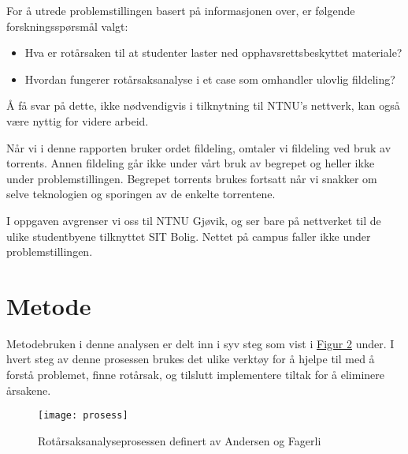 For å utrede problemstillingen basert på informasjonen over, er følgende forskningsspørsmål valgt: 
\begin{itemize}
    \item Hva er rotårsaken til at studenter laster ned opphavsrettsbeskyttet materiale?
    \item Hvordan fungerer rotårsaksanalyse i et case som omhandler ulovlig fildeling?
\end{itemize}

Å få svar på dette, ikke nødvendigvis i tilknytning til NTNU's nettverk, kan også være nyttig for videre arbeid.

Når vi i denne rapporten bruker ordet fildeling, omtaler vi fildeling ved bruk av torrents. Annen fildeling går ikke under vårt bruk av begrepet og heller ikke under problemstillingen. Begrepet torrents brukes fortsatt når vi snakker om selve teknologien og sporingen av de enkelte torrentene.

I oppgaven avgrenser vi oss til NTNU Gjøvik, og ser bare på nettverket til de ulike studentbyene tilknyttet SIT Bolig. Nettet på campus faller ikke under problemstillingen.

\section{Metode}
Metodebruken i denne analysen er delt inn i syv steg som vist i \hyperref[fig:prosess]{Figur 2} under. I hvert steg av denne prosessen brukes det ulike verktøy for å hjelpe til med å forstå problemet, finne rotårsak, og tilslutt implementere tiltak for å eliminere årsakene. 
\begin{figure}[H]
    \centering
    \texttt{[image: prosess]}
    \label{fig:prosess}
    \caption[Rotårsaksanalyseprosessen]{Rotårsaksanalyseprosessen definert av Andersen og Fagerli}
\end{figure}